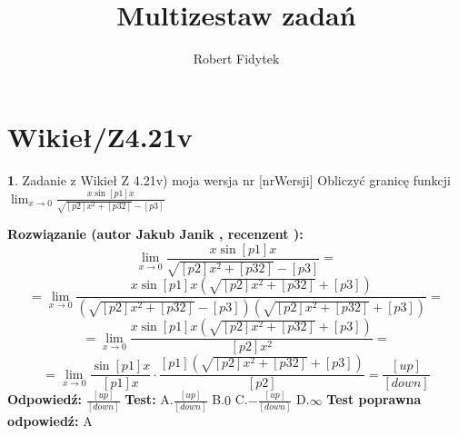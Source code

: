 \documentclass[12pt, a4paper]{article}
\title{Multizestaw zadań}
\author{Robert Fidytek}
\date{}
\theoremstyle{definition} %
\newtheorem{zad}{}
\newcommand{\kategoria}[1]{\section{#1}} %
\newcommand{\zadStart}[1]{\begin{zad}#1\newline} %
\newcommand{\zadStop}{\end{zad}}   %
\newcommand{\rozwStart}[2]{\noindent \textbf{Rozwiązanie (autor #1 , recenzent #2): }\newline} %
\newcommand{\odpStart}{\noindent \textbf{Odpowiedź:}\newline}    %
\newcommand{\odpStop}{\newline}                                             %
\newcommand{\testStart}{\noindent \textbf{Test:}\newline} %
\newcommand{\testStop}{\newline} %
\newcommand{\kluczStart}{\noindent \textbf{Test poprawna odpowiedź:}\newline} %
\newcommand{\kluczStop}{\newline} %
\begin{document}
\maketitle


\kategoria{Wikieł/Z4.21v}
\zadStart{Zadanie z Wikieł Z 4.21v) moja wersja nr [nrWersji]}
Obliczyć granicę funkcji $\lim_{x \to 0} \frac{x\sin{[p1]x}}{\sqrt{[p2]x^2+[p32]}-[p3]}$
\zadStop
\rozwStart{Jakub Janik}{}
$$\lim_{x \to 0} \frac{x\sin{[p1]x}}{\sqrt{[p2]x^2+[p32]}-[p3]}=$$
$$=\lim_{x \to 0} \frac{x\sin{[p1]x}(\sqrt{[p2]x^2+[p32]}+[p3])}{(\sqrt{[p2]x^2+[p32]}-[p3])(\sqrt{[p2]x^2+[p32]}+[p3])}=$$
$$=\lim_{x \to 0} \frac{x\sin{[p1]x}(\sqrt{[p2]x^2+[p32]}+[p3])}{[p2]x^2}=$$
$$=\lim_{x \to 0} \frac{\sin{[p1]x}}{[p1]x}\cdot\frac{[p1](\sqrt{[p2]x^2+[p32]}+[p3])}{[p2]}=\frac{[up]}{[down]}$$
\odpStart
$\frac{[up]}{[down]}$
\odpStop
\testStart
A.$\frac{[up]}{[down]}$
B.$0$
C.$-\frac{[up]}{[down]}$
D.$\infty$
\testStop
\kluczStart
A
\kluczStop
\end{document}
